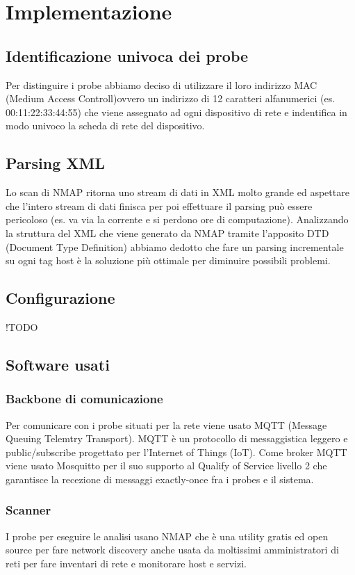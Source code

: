 \documentclass[target=bach,aauheader=,style=]{thud}
\begin{document}
\FloatBarrier

\chapter{Implementazione}

\section{Identificazione univoca dei probe}
Per distinguire i probe abbiamo deciso di utilizzare il loro indirizzo MAC (Medium Access Controll)ovvero un indirizzo di 12 caratteri alfanumerici (es. 00:11:22:33:44:55) che viene assegnato ad ogni dispositivo di rete e indentifica in modo univoco la scheda di rete del dispositivo.

\section{Parsing XML}
Lo scan di NMAP ritorna uno stream di dati in XML molto grande ed aspettare che l'intero stream di dati finisca per poi effettuare il parsing può essere pericoloso (es. va via la corrente e si perdono ore di computazione). Analizzando la struttura del XML che viene generato da NMAP tramite l'apposito DTD (Document Type Definition) abbiamo dedotto che fare un parsing incrementale su ogni tag host è la soluzione più ottimale per diminuire possibili problemi.

\section{Configurazione}
!TODO

\section{Software usati}

\subsection{Backbone di comunicazione}
Per comunicare con i probe situati per la rete viene usato MQTT (Message Queuing Telemtry Transport). 
MQTT è un protocollo di messaggistica leggero e public/subscribe progettato per l'Internet of Things (IoT).
Come broker MQTT viene usato Mosquitto per il suo supporto al Qualify of Service livello 2 che garantisce la recezione di messaggi exactly-once fra i probes e il sistema.

\subsection{Scanner}
I probe per eseguire le analisi usano NMAP che è una utility gratis ed open source per fare network discovery anche usata da moltissimi amministratori di reti per fare inventari di rete e monitorare host e servizi. 
\end{document}
